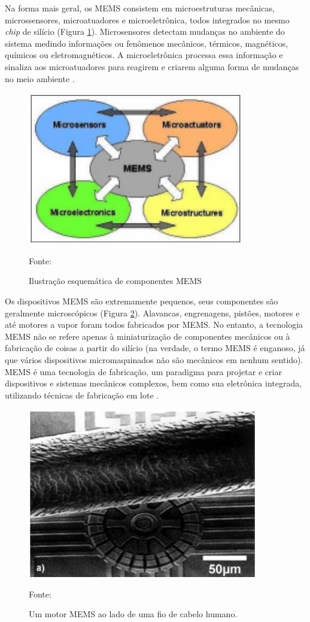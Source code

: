 		Na forma mais geral, os MEMS consistem em microestruturas mecânicas, microssensores, microatuadores e microeletrônica, todos integrados no mesmo \textit{chip} de silício (Figura \ref{esquematico_mems}). Microsensores detectam mudanças no ambiente do sistema medindo informações ou fenômenos mecânicos, térmicos, magnéticos, químicos ou eletromagnéticos. A microeletrônica processa essa informação e sinaliza aos microatuadores para reagirem e criarem alguma forma de mudanças no meio ambiente \cite{prime2002}.

		\begin{figure}[h!]
			\centering
			\includegraphics[keepaspectratio=true,scale=0.7
			]{figuras/esquematico_mems.png}
			\caption{Ilustração esquemática de componentes MEMS}
			Fonte: \cite{prime2002}
			\label{esquematico_mems}
		\end{figure}

		Os dispositivos MEMS são extremamente pequenos, seus componentes são geralmente microscópicos (Figura \ref{escala_mems}). Alavancas, engrenagens, pistões, motores e até motores a vapor foram todos fabricados por MEMS. No entanto, a tecnologia MEMS não se refere apenas à miniaturização de componentes mecânicos ou à fabricação de coisas a partir do silício (na verdade, o termo MEMS é enganoso, já que vários dispositivos micromaquinados não são mecânicos em nenhum sentido). MEMS é uma tecnologia de fabricação, um paradigma para projetar e criar dispositivos e sistemas mecânicos complexos, bem como sua eletrônica integrada, utilizando técnicas de fabricação em lote \cite{prime2002}.

		\begin{figure}[h!]
			\centering
			\includegraphics[keepaspectratio=true,scale=0.5
			]{figuras/escala_mems.png}
			\caption{Um motor MEMS ao lado de uma fio de cabelo humano.}
			Fonte: \cite{prime2002}
			\label{escala_mems}
		\end{figure}


